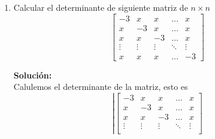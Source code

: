 \documentclass[12pt]{article}
\newenvironment{solucion}
{\begin{mdframed}[backgroundcolor=black!10]
		{\bf Solución:}\\
	}
	{
	\end{mdframed}
}
\newenvironment{preguntas}
{\begin{enumerate}\itemsep12pt
	}
	{
	\end{enumerate}
}
\begin{document}
\begin{preguntas}
\begin{solucion}
$$\begin{bmatrix}
		1 & 1 & 1 & \dots & 3 & 3 \\ 
		1 & 1 & 1 & \dots & 1 & 3
		\end{bmatrix}\right|$$
		En primer lugar, ponderemos la primera fila por $\dfrac{1}{3}$. Al hacer esto, debemos multiplicar por 3 afuera para mantener el valor del determinante igual.
		$$det(A) = 3 \left|\begin{bmatrix}
		1 & 1 & 1 & \dots & 1 & 1 \\ 
		1 & 3 & 3 & \dots & 3 & 3 \\ 
		1 & 1 & 3 & \dots & 3 & 3 \\ 
		\vdots & \vdots & \vdots & \ddots & \vdots & \vdots \\ 
		1 & 1 & 1 & \dots & 3 & 3 \\ 
		1 & 1 & 1 & \dots & 1 & 3
		\end{bmatrix}\right|$$
		Ahora, a todas las filas (menos a la primera) le restaremos la primera fila
		$$det(A) = 3 \left|\begin{bmatrix}
		1 & 1 & 1 & \dots & 1 & 1 \\ 
		0 & 2 & 2 & \dots & 2 & 2 \\ 
		0 & 0 & 2 & \dots & 2 & 2 \\ 
		\vdots & \vdots & \vdots & \ddots & \vdots & \vdots \\ 
		0 & 0 & 0 & \dots & 2 & 2 \\ 
		0 & 0 & 0 & \dots & 0 & 2
		\end{bmatrix}\right|$$
		Notemos ahora que la diagonal está compuesta de un 1 y luego puros 2, por lo que
		$$det(A) = 3 \cdot 2^{n-1}$$
\end{solucion}
\item Calcular el determinante de siguiente matriz de $n\times n$
	$$ \begin{bmatrix}
	-3 & x & x & \dots & x \\
	x & -3 & x & \dots & x \\
	x & x & -3 & \dots & x \\
	\vdots & \vdots & \vdots & \ddots & \vdots \\
	x & x & x & \dots & -3
	\end{bmatrix}$$
\begin{solucion}
Calulemos el determinante de la matriz, esto es
		$$ \left|\begin{bmatrix}
		-3 & x & x & \dots & x \\
		x & -3 & x & \dots & x \\
		x & x & -3 & \dots & x \\
		\vdots & \vdots & \vdots & \ddots & \vdots \\

\end{bmatrix}$$
\end{solucion}
\end{preguntas}
\end{document}
